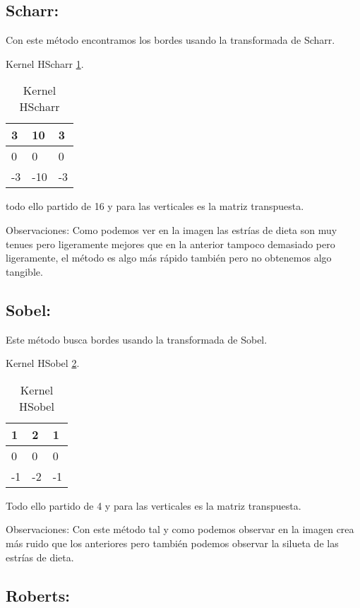 \subsection{Scharr:}
Con este método encontramos los bordes usando la transformada de Scharr.

Kernel HScharr \ref{F_k3}.
\begin{table}[]
	\centering
	\caption{Kernel HScharr}
	\label{F_k3}
	\begin{tabular}{|l|l|l|}
		\hline
		3  & 10  & 3 \\ \hline
		0  & 0   & 0 \\ \hline
		-3 & -10 & -3 \\ \hline
	\end{tabular}
\end{table}
todo ello partido de 16 y para las verticales es la matriz transpuesta. 




Observaciones:
Como podemos ver en la imagen las estrías de dieta son muy tenues pero ligeramente mejores que en la anterior tampoco demasiado pero ligeramente, el método es algo más rápido también pero no obtenemos algo tangible.




\subsection{Sobel:}
Este método busca bordes usando la transformada de Sobel.


Kernel HSobel \ref{F_k4}.
\begin{table}[]
	\centering
	\caption{Kernel HSobel}
	\label{F_k4}
	\begin{tabular}{|l|l|l|}
		\hline
		1  & 2  & 1 \\ \hline
		0  & 0  & 0 \\ \hline
		-1 & -2 & -1 \\ \hline
	\end{tabular}
\end{table}
Todo ello partido de 4 y para las verticales es la matriz transpuesta. 




Observaciones: 
Con este método tal y como podemos observar en la imagen crea más ruido que los anteriores pero también podemos observar la silueta de las estrías de dieta.


\subsection{Roberts:}

